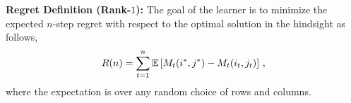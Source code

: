 \textbf{Regret Definition (Rank-$1$):} The goal of the learner is to minimize the expected $n$-step regret with respect to the optimal solution in the hindsight as follows,
\begin{align}
  R(n) =
  \sum_{t = 1}^n \mathbb{E}\left[M_t(i^\ast, j^\ast) - M_t(i_t,j_t)\right]\,,
  \label{eq:regret}
\end{align}
where the expectation is over any random choice of rows and columns. 








